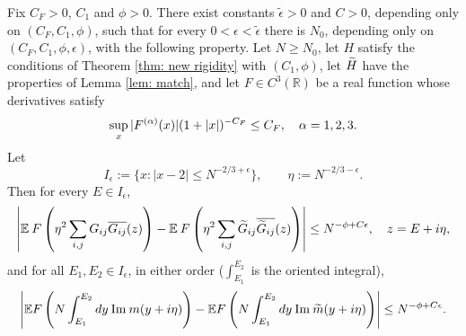 \begin{lem} \label{lem:green}
Fix $C_F>0$, $C_1$ and $\phi>0$. There exist constants $\widetilde{\epsilon} > 0$ and $C>0$, depending only on $(C_F,C_1,\phi)$, such that for every $0<\epsilon < \widetilde{\epsilon}$ there is $N_0$, depending only on $(C_F,C_1,\phi,\epsilon)$, with the following property. Let $N\ge N_0$, let $H$ satisfy the conditions of Theorem \ref{thm: new rigidity} with $(C_1,\phi)$, let $\widetilde H$ have the properties of Lemma \ref{lem: match}, and let $F\in C^3(\mathbb{R})$ be a real function whose derivatives satisfy
\begin{equation}\label{jhw2}
\sup_x | F^{(\alpha)} (x) | (1+ |x|)^{-C_F} \leq C_F, \quad \alpha = 1, 2, 3.
\end{equation}
Let
\begin{equation}\label{qglm}
I_{\epsilon}:=\{ x : |x-2| \leq N^{-2/3 + \epsilon} \}, \qquad \eta := N^{-2/3 - \epsilon}.
\end{equation}
Then for every $E\in I_\epsilon$,
\begin{equation}\label{mainpear}
\left| \mathbb{E} \: F \left( \eta^2 \sum_{i, j} G _{ij} \overline{G _{ij}} (z)\right)
 - \mathbb{E} \: F \left( \eta^2 \sum_{i, j} \widetilde G _{ij} \overline{\widetilde G _{ij}} (z)\right) \right| \leq N^{-\phi + C\epsilon}, \quad z=E+i\eta,
\end{equation}
and for all $E_1, E_2\in I_\epsilon$, in either order ($\int_{E_1}^{E_2}$ is the oriented integral),
\begin{equation}\label{sbc22}
\left| \mathbb{E} F \left( N \int_{E_1}^{E_2} dy \: \mathrm{Im}\: m (y + i \eta) \right) - \mathbb{E}  F \left( N \int_{E_1}^{E_2} dy \: \mathrm{Im}\: \widetilde m (y + i \eta) \right) \right| \leq N^{-\phi + C \epsilon}.
\end{equation}
\end{lem}

